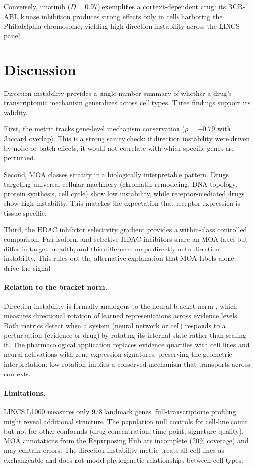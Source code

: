 \documentclass[11pt]{article}
\begin{document}
Conversely, imatinib ($D = 0.97$) exemplifies a context-dependent drug:
its BCR-ABL kinase inhibition produces strong effects only in cells
harboring the Philadelphia chromosome, yielding high direction instability
across the LINCS panel.

\section{Discussion}

Direction instability provides a single-number summary of whether a drug's
transcriptomic mechanism generalizes across cell types. Three findings
support its validity.

First, the metric tracks gene-level mechanism conservation ($\rho = -0.79$
with Jaccard overlap). This is a strong sanity check: if direction
instability were driven by noise or batch effects, it would not correlate
with which specific genes are perturbed.

Second, MOA classes stratify in a biologically interpretable pattern.
Drugs targeting universal cellular machinery (chromatin remodeling, DNA
topology, protein synthesis, cell cycle) show low instability, while
receptor-mediated drugs show high instability. This matches the
expectation that receptor expression is tissue-specific.

Third, the HDAC inhibitor selectivity gradient provides a within-class
controlled comparison. Pan-isoform and selective HDAC inhibitors share
an MOA label but differ in target breadth, and this difference maps
directly onto direction instability. This rules out the alternative
explanation that MOA labels alone drive the signal.

\paragraph{Relation to the bracket norm.}
Direction instability is formally analogous to the neural bracket norm
\citep{tower2026bracket}, which measures directional rotation of
learned representations across evidence levels. Both metrics detect when a
system (neural network or cell) responds to a perturbation (evidence or
drug) by rotating its internal state rather than scaling it. The
pharmacological application replaces evidence quartiles with cell lines
and neural activations with gene expression signatures, preserving the
geometric interpretation: low rotation implies a conserved mechanism that
transports across contexts.

\paragraph{Limitations.}
LINCS L1000 measures only 978 landmark genes; full-transcriptome profiling
might reveal additional structure. The population null controls for
cell-line count but not for other confounds (drug concentration, time point,
signature quality). MOA annotations from the Repurposing Hub are incomplete
(20\% coverage) and may contain errors. The direction-instability metric
treats all cell lines as exchangeable and does not model phylogenetic
relationships between cell types.
\end{document}
